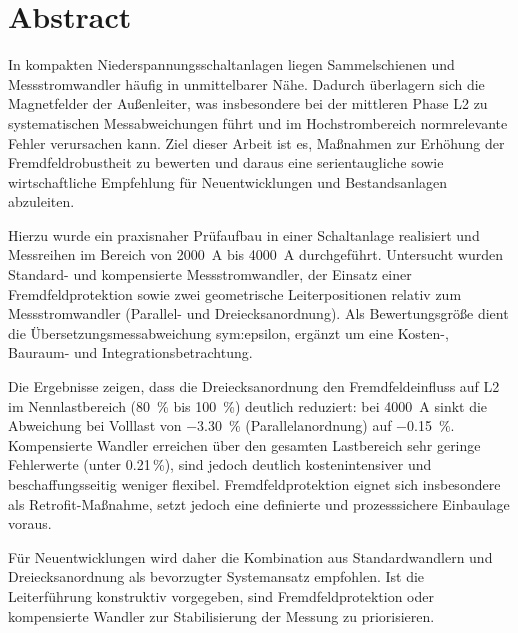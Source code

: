 
\section*{Abstract}

In kompakten Niederspannungsschaltanlagen liegen Sammelschienen und Messstromwandler häufig in unmittelbarer Nähe. Dadurch überlagern sich die Magnetfelder der Außenleiter, was insbesondere bei der mittleren Phase L2 zu systematischen Messabweichungen führt und im Hochstrombereich normrelevante Fehler verursachen kann. Ziel dieser Arbeit ist es, Maßnahmen zur Erhöhung der Fremdfeldrobustheit zu bewerten und daraus eine serientaugliche sowie wirtschaftliche Empfehlung für Neuentwicklungen und Bestandsanlagen abzuleiten.

Hierzu wurde ein praxisnaher Prüfaufbau in einer Schaltanlage realisiert und Messreihen im Bereich von \SI{2000}{A} bis \SI{4000}{A} durchgeführt. Untersucht wurden Standard- und kompensierte Messstromwandler, der Einsatz einer Fremdfeldprotektion sowie zwei geometrische Leiterpositionen relativ zum Messstromwandler (Parallel- und Dreiecksanordnung). Als Bewertungsgröße dient die Übersetzungsmessabweichung \gls{sym:epsilon}, ergänzt um eine Kosten-, Bauraum- und Integrationsbetrachtung.

Die Ergebnisse zeigen, dass die Dreiecksanordnung den Fremdfeldeinfluss auf L2 im Nennlastbereich (\SI{80}{\percent} bis \SI{100}{\percent}) deutlich reduziert: bei \SI{4000}{A} sinkt die Abweichung bei Volllast von \SI{-3,30}{\percent} (Parallelanordnung) auf \SI{-0,15}{\percent}. Kompensierte Wandler erreichen über den gesamten Lastbereich sehr geringe Fehlerwerte (unter \num{0,21}\,\%), sind jedoch deutlich kostenintensiver und beschaffungsseitig weniger flexibel. Fremdfeldprotektion eignet sich insbesondere als Retrofit-Maßnahme, setzt jedoch eine definierte und prozesssichere Einbaulage voraus.

Für Neuentwicklungen wird daher die Kombination aus Standardwandlern und Dreiecksanordnung als bevorzugter Systemansatz empfohlen. Ist die Leiterführung konstruktiv vorgegeben, sind Fremdfeldprotektion oder kompensierte Wandler zur Stabilisierung der Messung zu priorisieren.
